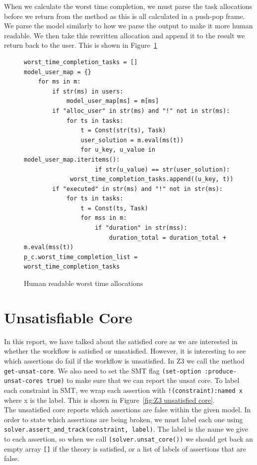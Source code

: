 \documentclass[a4paper]{report}
\begin{document}
When we calculate the worst time completion, we must parse the task allocations before we return from the method as this is all calculated in a push-pop frame. We parse the model similarly to how we parse the output to make it more human readable. We then take this rewritten allocation and append it to the result we return back to the user. This is shown in Figure~\ref{fig:Human readable worst time allocations}\\

\begin{figure}
\lstset{numbers=left, showspaces=false,
    showstringspaces=false, tabsize=2, breaklines=true,
    xleftmargin=5.0ex,
}
\begin{lstlisting}[frame=single]
worst_time_completion_tasks = []
model_user_map = {}
	for ms in m:
		if str(ms) in users:
			model_user_map[ms] = m[ms]
		if "alloc_user" in str(ms) and "!" not in str(ms):
			for ts in tasks:
				t = Const(str(ts), Task)
				user_solution = m.eval(ms(t))
				for u_key, u_value in model_user_map.iteritems():
					if str(u_value) == str(user_solution):
             worst_time_completion_tasks.append((u_key, t))
		if "executed" in str(ms) and "!" not in str(ms):
			for ts in tasks:
				t = Const(ts, Task)
				for mss in m:
					if "duration" in str(mss):
						duration_total = duration_total + m.eval(mss(t))
p_c.worst_time_completion_list = worst_time_completion_tasks
\end{lstlisting}
\caption{Human readable worst time allocations}
\label{fig:Human readable worst time allocations}
\end{figure}

\section{Unsatisfiable Core}
In this report, we have talked about the satisfied core as we are interested in whether the workflow is satisfied or unsatisfied. However, it is interesting to see which assertions do fail if the workflow is unsatisfied. In Z3 we call the method \texttt{get-unsat-core}. We also need to set the SMT flag \texttt{(set-option :produce-unsat-cores true)} to make sure that we can report the unsat core. To label each constraint in SMT, we wrap each assertion with \texttt{!(constraint):named x} where x is the label. This is shown in Figure~\ref{fig:Z3 unsatisfied core}. \\

The unsatisfied core reports which assertions are false within the given model. In order to state which assertions are being broken, we must label each one using \texttt{solver.assert\_and\_track(constraint, label)}. The label is the name we give to each assertion, so when we call \texttt{(solver.unsat\_core())} we should get back an empty array \texttt{[]} if the theory is satisfied, or a list of labels of assertions that are false. \\
\end{document}
